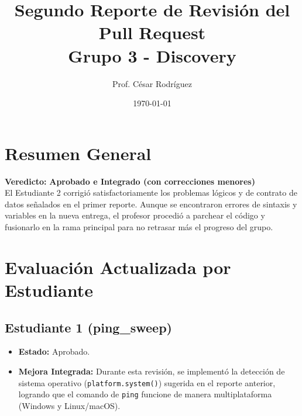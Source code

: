 \documentclass[12pt,a4paper]{article}
\title{Segundo Reporte de Revisión del Pull Request \\ \large Grupo 3 - Discovery}
\author{Prof. César Rodríguez}
\date{\today}
\begin{document}
\maketitle

\section*{Resumen General}
\textbf{Veredicto:} \textcolor{green!70!black}{\textbf{Aprobado e Integrado (con correcciones menores)}} \\
El Estudiante 2 corrigió satisfactoriamente los problemas lógicos y de contrato de datos señalados en el primer reporte. Aunque se encontraron errores de sintaxis y variables en la nueva entrega, el profesor procedió a parchear el código y fusionarlo en la rama principal para no retrasar más el progreso del grupo.

\section*{Evaluación Actualizada por Estudiante}

\subsection*{\textcolor{green!70!black}{Estudiante 1 (ping\_sweep)}}
\begin{itemize}[label=$\bullet$]
    \item \textbf{Estado:} Aprobado.
    \item \textbf{Mejora Integrada:} Durante esta revisión, se implementó la detección de sistema operativo (\texttt{platform.system()}) sugerida en el reporte anterior, logrando que el comando de \texttt{ping} funcione de manera multiplataforma (Windows y Linux/macOS).
\end{itemize}
\end{document}
